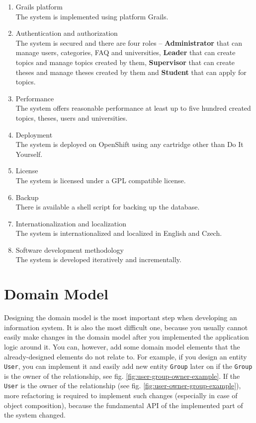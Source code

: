 \begin{enumerate}
    \item Grails platform\\
    The system is implemented using platform Grails.

    \item Authentication and authorization\\
    The system is secured and there are four roles -- \textbf{Administrator} that can manage users, categories, FAQ and universities, \textbf{Leader} that can create topics and manage topics created by them, \textbf{Supervisor} that can create theses and manage theses created by them and \textbf{Student} that can apply for topics.

    \item Performance\\
    The system offers reasonable performance at least up to five hundred created topics, theses, users and universities.

    \item Deployment\\
    The system is deployed on OpenShift using any cartridge other than Do It Yourself.

    \item License\\
    The system is licensed under a GPL compatible license.

    \item Backup\\
    There is available a shell script for backing up the database.

    \item Internationalization and localization\\
    The system is internationalized and localized in English and Czech.

    \item Software development methodology\\
    The system is developed iteratively and incrementally.

\end{enumerate}

\section{Domain Model}

Designing the domain model is the most important step when developing an information system. It is also the most difficult one, because you usually cannot easily make changes in the domain model after you implemented the application logic around it. You can, however, add some domain model elements that the already-designed elements do not relate to. For example, if you design an entity \texttt{User}, you can implement it and easily add new entity \texttt{Group} later on if the \texttt{Group} is the owner of the relationship, see fig. \ref{fig:user-group-owner-example}. If the \texttt{User} is the owner of the relationship (see fig. \ref{fig:user-owner-group-example}), more refactoring is required to implement such changes (especially in case of object composition), because the fundamental API of the implemented part of the system changed.

